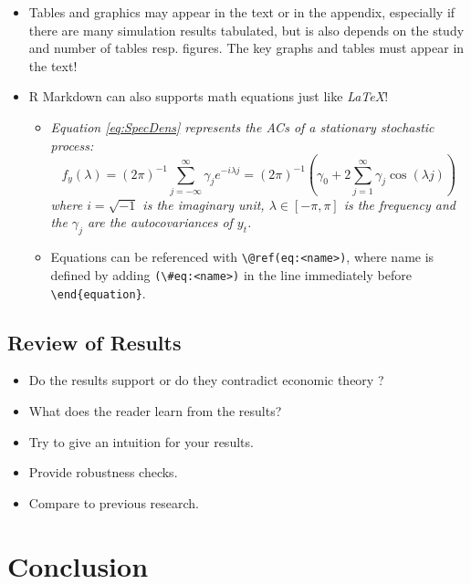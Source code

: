 \documentclass[a4paper,11pt]{article}
\begin{document}
\begin{itemize}
\item
  Tables and graphics may appear in the text or in the appendix, especially if
  there are many simulation results tabulated, but is also depends on the study
  and number of tables resp. figures. The key graphs and tables must appear in
  the text!
\item
  R Markdown can also supports math equations just like \emph{LaTeX}!
  \begin{itemize}
  \item
    \emph{Equation \eqref{eq:SpecDens} represents the ACs of a stationary
    stochastic process:}
    \begin{equation}
            f_y(\lambda) = (2\pi)^{-1} \sum_{j=-\infty}^{\infty}
                           \gamma_j e^{-i\lambda j}
                         =(2\pi)^{-1}\left(\gamma_0 + 2 \sum_{j=1}^{\infty}
        \gamma_j \cos(\lambda j)\right)
                                       \label{eq:SpecDens}
    \end{equation}
    \emph{where \(i=\sqrt{-1}\) is the imaginary unit, \(\lambda \in [-\pi, \pi]\) is the
    frequency and the \(\gamma_j\) are the autocovariances of \(y_t\).}
  \item
    Equations can be referenced with \texttt{\textbackslash{}@ref(eq:\textless{}name\textgreater{})}, where name is defined
    by adding \texttt{(\textbackslash{}\#eq:\textless{}name\textgreater{})} in the line immediately before \texttt{\textbackslash{}end\{equation\}}.
  \end{itemize}
\end{itemize}
\hypertarget{review-of-results}{%
\subsection{Review of Results}\label{review-of-results}}
\begin{itemize}
\item
  Do the results support or do they contradict economic theory ?
\item
  What does the reader learn from the results?
\item
  Try to give an intuition for your results.
\item
  Provide robustness checks.
\item
  Compare to previous research.
\end{itemize}
\hypertarget{conclusion}{%
\section{Conclusion}\label{conclusion}}
\end{document}
